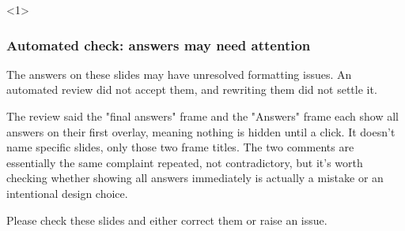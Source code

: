 \documentclass{beamer}
\begin{document}
\begin{frame}<1>
\frametitle{Automated check: answers may need attention}
The answers on these slides may have unresolved formatting issues. An automated
review did not accept them, and rewriting them did not settle it.

The review said the "final answers" frame and the "Answers" frame each show all answers on their first overlay, meaning nothing is hidden until a click. It doesn't name specific slides, only those two frame titles. The two comments are essentially the same complaint repeated, not contradictory, but it's worth checking whether showing all answers immediately is actually a mistake or an intentional design choice.

Please check these slides and either correct them or raise an issue.
\end{frame}
\end{document}
